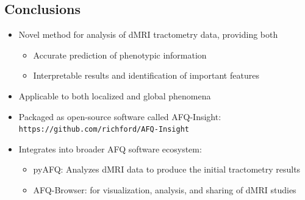 \documentclass[a0, landscape]{a0poster}
\begin{document}
\begin{multicols}{3}

\color{SaddleBrown} %

\vspace{-1.25em}
\section*{Conclusions}
\begin{itemize}
\item Novel method for analysis of dMRI tractometry data, providing both

    \begin{itemize}
    \item Accurate prediction of phenotypic information
    \item Interpretable results and identification of important features
    \end{itemize}

\item Applicable to both localized and global phenomena
\item Packaged as open-source software called AFQ-Insight: \texttt{https://github.com/richford/AFQ-Insight}

\item Integrates into broader AFQ software ecosystem:
    \begin{itemize}
    \item pyAFQ: Analyzes dMRI data to produce the initial tractometry results
    \item AFQ-Browser: for visualization, analysis, and sharing of dMRI studies
    \end{itemize}
\end{itemize}

\color{DarkSlateGray} %
\vspace{-1.25em}


\nocite{*} %
\footnotesize  %


\end{multicols}
\end{document}
